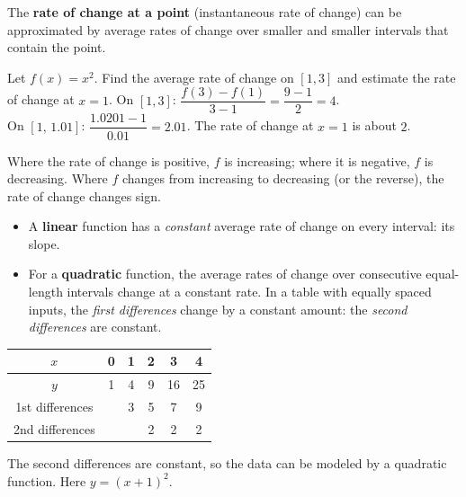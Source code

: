\documentclass[11pt]{article}
\begin{document}
The \textbf{rate of change at a point} (instantaneous rate of change) can be approximated by average rates of change over smaller and smaller intervals that contain the point.

\begin{example}
Let $f(x)=x^2$. Find the average rate of change on $[1,3]$ and estimate the rate of change at $x=1$.
\sol On $[1,3]$: $\dfrac{f(3)-f(1)}{3-1}=\dfrac{9-1}{2}=4$.\\
On $[1,\,1.01]$: $\dfrac{1.0201-1}{0.01}=2.01$. The rate of change at $x=1$ is about $2$.
\end{example}

\begin{keyidea}
Where the rate of change is positive, $f$ is increasing; where it is negative, $f$ is decreasing. Where $f$ changes from increasing to decreasing (or the reverse), the rate of change changes sign.
\end{keyidea}

\begin{keyidea}
\begin{itemize}
\item A \textbf{linear} function has a \emph{constant} average rate of change on every interval: its slope.
\item For a \textbf{quadratic} function, the average rates of change over consecutive equal-length intervals change at a constant rate. In a table with equally spaced inputs, the \emph{first differences} change by a constant amount: the \emph{second differences} are constant.
\end{itemize}
\end{keyidea}

\begin{example}
\begin{center}\begin{tabular}{c|ccccc}
$x$ & 0 & 1 & 2 & 3 & 4\\\hline
$y$ & 1 & 4 & 9 & 16 & 25\\\hline
1st differences & & 3 & 5 & 7 & 9\\
2nd differences & & & 2 & 2 & 2
\end{tabular}\end{center}
\sol The second differences are constant, so the data can be modeled by a quadratic function. Here $y=(x+1)^2$.
\end{example}
\end{document}
